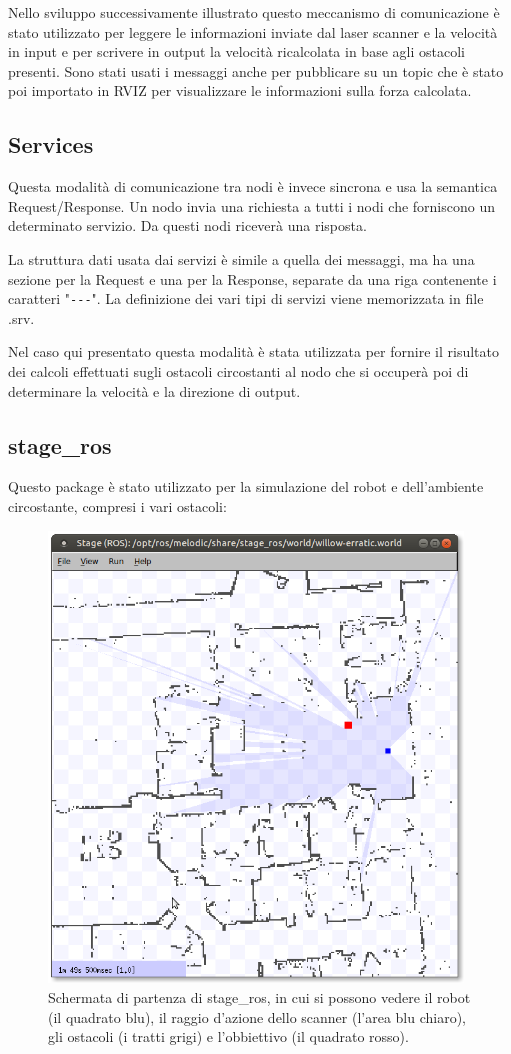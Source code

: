 \documentclass[Lau, binding=0.6cm, oneside]{sapthesis}
\begin{document}
Nello sviluppo successivamente illustrato questo meccanismo di comunicazione è stato utilizzato per leggere le informazioni inviate dal laser scanner e la velocità in input e per scrivere in output la velocità ricalcolata in base agli ostacoli presenti.
Sono stati usati i messaggi anche per pubblicare su un topic che è stato poi importato in RVIZ per visualizzare le informazioni sulla forza calcolata.

\subsection{Services}
Questa modalità di comunicazione tra nodi è invece sincrona e usa la semantica Request/Response.
Un nodo invia una richiesta a tutti i nodi che forniscono un determinato servizio.
Da questi nodi riceverà una risposta.

La struttura dati usata dai servizi è simile a quella dei messaggi, ma ha una sezione per la Request e una per la Response, separate da una riga contenente i caratteri "\lstinline{---}".
La definizione dei vari tipi di servizi viene memorizzata in file .srv.

Nel caso qui presentato questa modalità è stata utilizzata per fornire il risultato dei calcoli effettuati sugli ostacoli circostanti al nodo che si occuperà poi di determinare la velocità e la direzione di output.

\subsection{stage\_ros}
Questo package è stato utilizzato per la simulazione del robot e dell'ambiente circostante, compresi i vari ostacoli:

\begin{figure}[H]
    \centering
    \includegraphics[width=11cm]{stage_ros.png}
    \caption{Schermata di partenza di stage\_ros, in cui si possono vedere il robot (il quadrato blu), il raggio d'azione dello scanner (l'area blu chiaro), gli ostacoli (i tratti grigi) e l'obbiettivo (il quadrato rosso).}
    \label{fig:stage_ros}
\end{figure}
\end{document}
